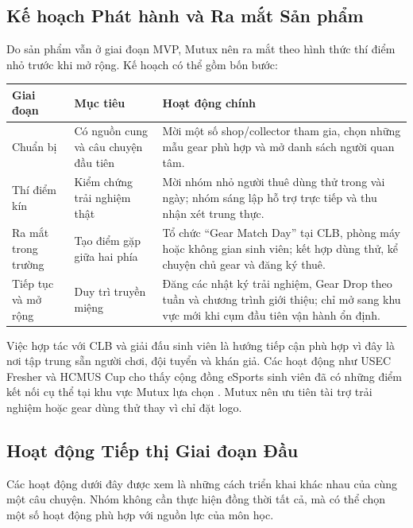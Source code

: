 \subsection{Kế hoạch Phát hành và Ra mắt Sản phẩm}

Do sản phẩm vẫn ở giai đoạn MVP, Mutux nên ra mắt theo hình thức thí điểm nhỏ trước khi mở rộng. Kế hoạch có thể gồm bốn bước:

\begin{longtable}{@{}p{}p{}p{}@{}}
\toprule
\textbf{Giai đoạn} & \textbf{Mục tiêu} & \textbf{Hoạt động chính} \\
\midrule
\endhead
Chuẩn bị & Có nguồn cung và câu chuyện đầu tiên & Mời một số shop/collector tham gia, chọn những mẫu gear phù hợp và mở danh sách người quan tâm. \\
Thí điểm kín & Kiểm chứng trải nghiệm thật & Mời nhóm nhỏ người thuê dùng thử trong vài ngày; nhóm sáng lập hỗ trợ trực tiếp và thu nhận xét trung thực. \\
Ra mắt trong trường & Tạo điểm gặp giữa hai phía & Tổ chức ``Gear Match Day'' tại CLB, phòng máy hoặc không gian sinh viên; kết hợp dùng thử, kể chuyện chủ gear và đăng ký thuê. \\
Tiếp tục và mở rộng & Duy trì truyền miệng & Đăng các nhật ký trải nghiệm, Gear Drop theo tuần và chương trình giới thiệu; chỉ mở sang khu vực mới khi cụm đầu tiên vận hành ổn định. \\
\bottomrule
\end{longtable}

Việc hợp tác với CLB và giải đấu sinh viên là hướng tiếp cận phù hợp vì đây là nơi tập trung sẵn người chơi, đội tuyển và khán giả. Các hoạt động như USEC Fresher và HCMUS Cup cho thấy cộng đồng eSports sinh viên đã có những điểm kết nối cụ thể tại khu vực Mutux lựa chọn \cite{vngUsecFresher2025,vngHcmusCup2026}. Mutux nên ưu tiên tài trợ trải nghiệm hoặc gear dùng thử thay vì chỉ đặt logo.

\subsection{Hoạt động Tiếp thị Giai đoạn Đầu}

Các hoạt động dưới đây được xem là những cách triển khai khác nhau của cùng một câu chuyện. Nhóm không cần thực hiện đồng thời tất cả, mà có thể chọn một số hoạt động phù hợp với nguồn lực của môn học.


